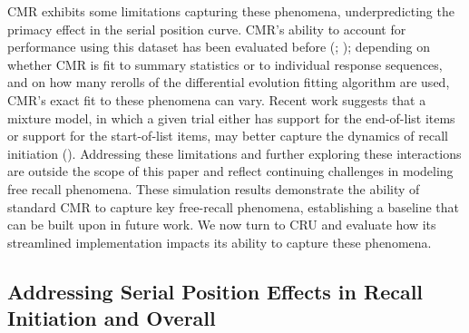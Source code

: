 \documentclass[
  man,
  floatsintext,
  longtable,
  nolmodern,
  notxfonts,
  notimes,
  draftfirst,
  colorlinks=true,linkcolor=blue,citecolor=blue,urlcolor=blue]{apa7}
\begin{document}
CMR exhibits some limitations capturing these phenomena, underpredicting
the primacy effect in the serial position curve. CMR's ability to
account for performance using this dataset has been evaluated before
(;
); depending
on whether CMR is fit to summary statistics or to individual response
sequences, and on how many rerolls of the differential evolution fitting
algorithm are used, CMR's exact fit to these phenomena can vary. Recent
work suggests that a mixture model, in which a given trial either has
support for the end-of-list items or support for the start-of-list
items, may better capture the dynamics of recall initiation
(). Addressing these
limitations and further exploring these interactions are outside the
scope of this paper and reflect continuing challenges in modeling free
recall phenomena. These simulation results demonstrate the ability of
standard CMR to capture key free-recall phenomena, establishing a
baseline that can be built upon in future work. We now turn to CRU and
evaluate how its streamlined implementation impacts its ability to
capture these phenomena.

\subsection{Addressing Serial Position Effects in Recall Initiation and
Overall}\label{addressing-serial-position-effects-in-recall-initiation-and-overall}
\end{document}
